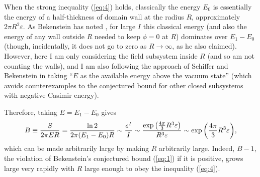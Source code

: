 \documentclass[a4paper,12pt]{article}
\begin{document}
	When the strong inequality (\ref{eq:4}) holds,
classically the energy $E_0$ is essentially the energy
of a half-thickness of domain wall at the radius $R$,
approximately $2\pi R^2 \varepsilon$.
As Bekenstein has noted
\cite{Bek9},
for large $I$ this classical energy
(and also the energy of any wall outside $R$
needed to keep $\phi = 0$ at $R$)
dominates over $E_1-E_0$
(though, incidentally, it does not go
to zero as $R \rightarrow \infty$,
as he also claimed).
However, here I am only considering
the field subsystem inside $R$
(and so am not counting the walls),
and I am also following the approach
of Schiffer and Bekenstein
\cite{SB1}
in taking ``$E$ as the available energy
above the vacuum state''
(which avoids counterexamples to
the conjectured bound for other closed
subsystems with negative Casimir energy).

	Therefore, taking $E = E_1 - E_0$ gives
 \begin{equation}
 B \equiv {S \over 2 \pi E R}
   = {\ln{2}\over 2\pi (E_1-E_0) R}
   \sim {e^I \over I}
   \sim {\exp{\left({4\pi\over 3}R^3\varepsilon\right)}
        \over R^3 \varepsilon}
   \sim \exp{\left({4\pi\over 3}R^3\varepsilon\right)},
 \label{eq:8}
 \end{equation}
which can be made arbitrarily large by making $R$
arbitrarily large.  Indeed, $B-1$, the violation
of Bekenstein's conjectured bound (\ref{eq:1}) if
it is positive, grows large very rapidly with $R$
large enough to obey the inequality (\ref{eq:4}).
\end{document}
